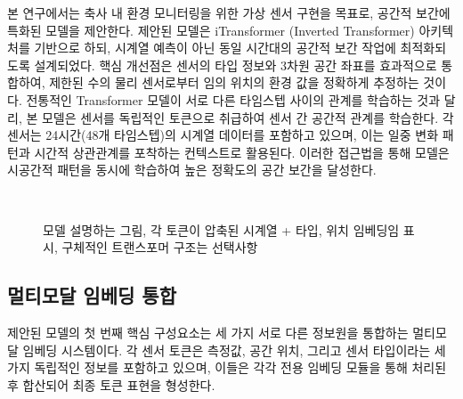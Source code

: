 \documentclass[final,5p,times,twocolumn,authoryear]{elsarticle}
\begin{document}
본 연구에서는 축사 내 환경 모니터링을 위한 가상 센서 구현을 목표로, 공간적 보간에 특화된 모델을 제안한다. 제안된 모델은 iTransformer (Inverted Transformer) \cite{liu2024iclr_itransformer} 아키텍처를 기반으로 하되, 시계열 예측이 아닌 동일 시간대의 공간적 보간 작업에 최적화되도록 설계되었다. 핵심 개선점은 센서의 타입 정보와 3차원 공간 좌표를 효과적으로 통합하여, 제한된 수의 물리 센서로부터 임의 위치의 환경 값을 정확하게 추정하는 것이다.
전통적인 Transformer 모델이 서로 다른 타임스텝 사이의 관계를 학습하는 것과 달리, 본 모델은 센서를 독립적인 토큰으로 취급하여 센서 간 공간적 관계를 학습한다. 각 센서는 24시간(48개 타임스텝)의 시계열 데이터를 포함하고 있으며, 이는 일중 변화 패턴과 시간적 상관관계를 포착하는 컨텍스트로 활용된다. 이러한 접근법을 통해 모델은 시공간적 패턴을 동시에 학습하여 높은 정확도의 공간 보간을 달성한다.

\begin{figure}[tp]%
  \centering
\captionsetup{width=\textwidth}
\caption{모델 설명하는 그림, 각 토큰이 압축된 시계열 + 타입, 위치 임베딩임 표시, 구체적인 트랜스포머 구조는 선택사항}
\end{figure}



\subsection{멀티모달 임베딩 통합}
제안된 모델의 첫 번째 핵심 구성요소는 세 가지 서로 다른 정보원을 통합하는 멀티모달 임베딩 시스템이다. 각 센서 토큰은 측정값, 공간 위치, 그리고 센서 타입이라는 세 가지 독립적인 정보를 포함하고 있으며, 이들은 각각 전용 임베딩 모듈을 통해 처리된 후 합산되어 최종 토큰 표현을 형성한다.
\end{document}
